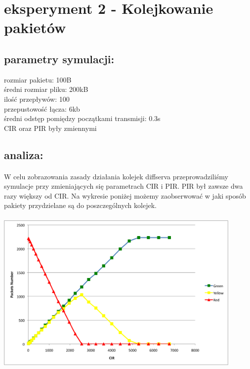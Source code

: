 \documentclass[a4paper]{article}
\begin{document}
\section{eksperyment 2 - Kolejkowanie pakietów}

\subsection{parametry symulacji:}

rozmiar pakietu: 100B\\
średni rozmiar pliku: 200kB\\
ilość przepływów: 100\\
przepustowość łącza: 6kb\\
średni odstęp pomiędzy początkami transmisji: 0.3s\\
CIR oraz PIR były zmiennymi\\
\subsection{analiza:}

\paragraph{}
W celu zobrazowania zasady działania kolejek diffserva przeprowadziliśmy symulacje przy zmieniających się parametrach CIR i PIR. PIR był zawsze dwa razy większy od CIR.
Na wykresie poniżej możemy zaobserwować w jaki sposób pakiety przydzielane są do poszczególnych kolejek.\\
\\



\includegraphics[width=120mm]{images/punkt_2_wykres.png}
\end{document}
